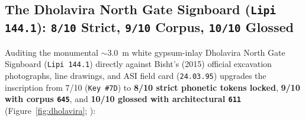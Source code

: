 \documentclass[11pt,a4paper]{article}
\begin{document}
\subsection{The Dholavira North Gate Signboard (\texttt{Lipi 144.1}): \texttt{8/10} Strict, \texttt{9/10} Corpus, \texttt{10/10} Glossed}

Auditing the monumental $\sim$3.0~m white gypsum-inlay Dholavira North Gate Signboard (\texttt{Lipi 144.1}) directly against Bisht's (2015) official excavation photographs, line drawings, and ASI field card (\texttt{24.03.95}) \citep{bisht2015} upgrades the inscription from 7/10 (\texttt{Key \#7D}) to \textbf{8/10 strict phonetic tokens locked}, \textbf{9/10 with corpus \texttt{645}}, and \textbf{10/10 glossed with architectural \texttt{611}} (Figure~\ref{fig:dholavira}; ):
\end{document}
